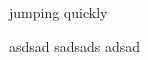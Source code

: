 \documentclass{article}
\makeatletter
\DeclareRobustCommand*\myul{%
			\def\SOUL@everyspace{\underline{\space}\kern\z@}
			\def\SOUL@everytoken{%
				\setbox0=\hbox{\the\SOUL@token}%
				\ifdim\dp0>\z@
					\the\SOUL@token
				\else
					\underline{\the\SOUL@token}%
				\fi%
			}
			\SOUL@%
		}
\makeatother
\begin{document}
\myul{jumping quickly}

\myul{asdsad sadsads adsad}
\end{document}
